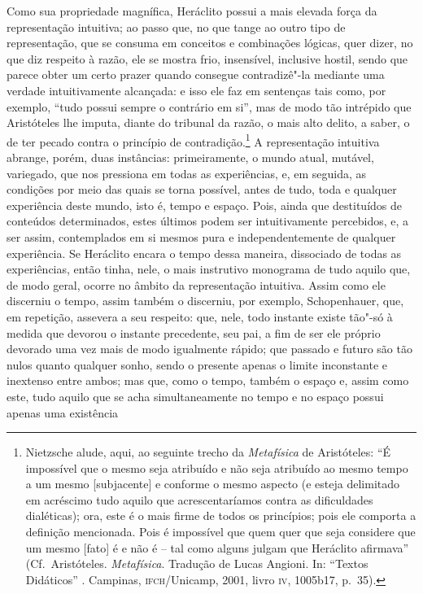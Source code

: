 Como sua propriedade magnífica, Heráclito possui a mais elevada força da
representação intuitiva; ao passo que, no que tange ao outro tipo de
representação, que se consuma em conceitos e combinações lógicas, quer
dizer, no que diz respeito à razão, ele se mostra frio, insensível,
inclusive hostil, sendo que parece obter um certo prazer quando
consegue contradizê"-la mediante uma verdade intuitivamente alcançada: e
isso ele faz em sentenças tais como, por exemplo, ``tudo possui sempre o
contrário em si'', mas de modo tão intrépido que Aristóteles lhe imputa,
diante do tribunal da razão, o mais alto delito, a saber, o de ter pecado
contra o princípio de contradição.\footnote{ Nietzsche alude, aqui, ao
seguinte trecho da \textit{Metafísica} de Aristóteles: ``É impossível
que o mesmo seja atribuído e não seja atribuído ao mesmo tempo a um
mesmo [subjacente] e conforme o mesmo aspecto (e esteja delimitado em
acréscimo tudo aquilo que acrescentaríamos contra as dificuldades
dialéticas); ora, este é o mais firme de todos os princípios; pois ele
comporta a definição mencionada. Pois é impossível que quem quer que
seja considere que um mesmo [fato] é e não é -- tal como alguns julgam
que Heráclito afirmava'' (Cf.~Aristóteles. \textit{Metafísica}. Tradução de
Lucas Angioni. In: ``Textos Didáticos'' . Campinas, \textsc{ifch}/Unicamp, 2001,
livro \textsc{iv}, 1005b17, p.~35).} A representação intuitiva abrange,
porém, duas instâncias: primeiramente, o mundo atual, mutável,
variegado, que nos pressiona em todas as experiências, e, em
seguida, as condições por meio das quais se torna possível, antes de
tudo, toda e qualquer experiência deste mundo, isto é, tempo e espaço.
Pois, ainda que destituídos de conteúdos determinados, estes últimos
podem ser intuitivamente percebidos, e, a ser assim, contemplados em si
mesmos pura e independentemente de qualquer experiência. Se Heráclito
encara o tempo dessa maneira, dissociado de todas as experiências,
então tinha, nele, o mais instrutivo monograma de tudo aquilo que, de
modo geral, ocorre no âmbito da representação intuitiva. Assim como ele
discerniu o tempo, assim também o discerniu, por exemplo, Schopenhauer,
que, em repetição, assevera a seu respeito: que, nele, todo instante
existe tão"-só à medida que devorou o instante precedente, seu pai, a
fim de ser ele próprio devorado uma vez mais de modo igualmente rápido;
que passado e futuro são tão nulos quanto qualquer sonho, sendo o
presente apenas o limite inconstante e inextenso entre ambos; mas que,
como o tempo, também o espaço e, assim como este, tudo aquilo que se
acha simultaneamente no tempo e no espaço possui apenas uma existência
